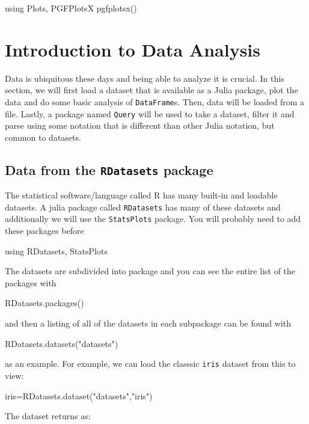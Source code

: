 
\begin{jlcode}[data]
using Plots, PGFPlotsX
pgfplotsx()
\end{jlcode}

\chapter{Introduction to Data Analysis} \label{ch:data}

Data is ubiquitous these days and being able to analyze it is crucial.  In this section, we will first load a dataset that is available as a Julia package, plot the data and do some basic analysis of \texttt{DataFrame}s.  Then, data will be loaded from a file.  Lastly, a package named \texttt{Query} will be used to take a dataset, filter it and parse using some notation that is different than other Julia notation, but common to datasets.  


\section{Data from the \texttt{RDatasets} package}\label{data-from-other-sources}

The statistical software/language called R has many built-in and loadable datasets.  A julia package called \texttt{RDatasets} has many of these datasets and additionally we will use the  \texttt{StatsPlots} package.  You will probably need to add these packages before 
%
\begin{jlblock}[data]
using RDatasets, StatsPlots
\end{jlblock}

The datasets are subdivided into package and you can see the entire list of the packages with
%
\begin{jlblock}[data]
RDatasets.packages()
\end{jlblock}
%
and then a listing of all of the datasets in each subpackage can be
found with
%
\begin{jlblock}[data]
RDatasets.datasets("datasets")
\end{jlblock}

as an example.  For example, we can load the classsic \texttt{iris} dataset from this to view:
%
\begin{jlblock}[data]
iris=RDatasets.dataset("datasets","iris")
\end{jlblock}
The dataset returns as:  \printpythontex[verbatim]

